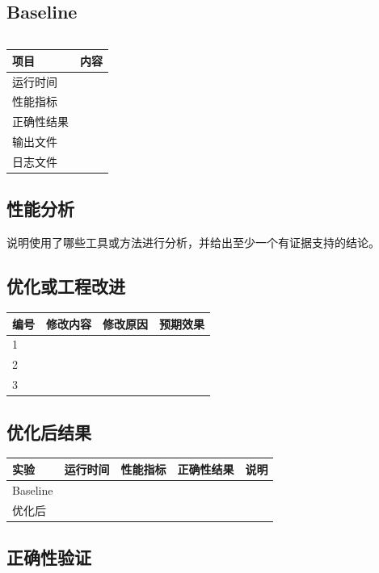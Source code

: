 \documentclass[UTF8]{ctexart}
\begin{document}
\subsection{Baseline}

\begin{lstlisting}[language=bash]

\end{lstlisting}

\begin{tabular}{ll}
\toprule
项目 & 内容 \\
\midrule
运行时间 &  \\
性能指标 &  \\
正确性结果 &  \\
输出文件 &  \\
日志文件 &  \\
\bottomrule
\end{tabular}

\subsection{性能分析}

说明使用了哪些工具或方法进行分析，并给出至少一个有证据支持的结论。

\subsection{优化或工程改进}

\begin{tabular}{llll}
\toprule
编号 & 修改内容 & 修改原因 & 预期效果 \\
\midrule
1 &  &  &  \\
2 &  &  &  \\
3 &  &  &  \\
\bottomrule
\end{tabular}

\subsection{优化后结果}

\begin{tabular}{lllll}
\toprule
实验 & 运行时间 & 性能指标 & 正确性结果 & 说明 \\
\midrule
Baseline &  &  &  &  \\
优化后 &  &  &  &  \\
\bottomrule
\end{tabular}

\subsection{正确性验证}
\end{document}
